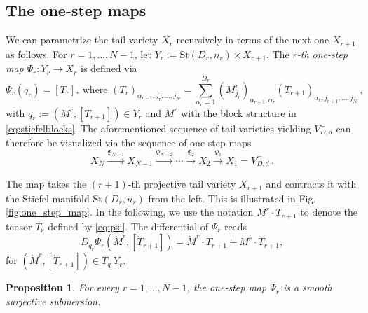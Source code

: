 \documentclass{article}
\newtheorem{proposition}[theorem]{Proposition}
\theoremstyle{definition}
\newcommand{\St}{\mathrm{St}}
\begin{document}
\subsection*{The one-step maps}\label{sec:one_step_map}

We can parametrize the tail variety $X_r$ recursively in terms of the next one $X_{r+1}$ as follows. For \(r=1,\dots,N-1\), let $Y_r := \St(D_r,n_r)\times X_{r+1}$. The \emph{$r$-th one-step map} $\Psi_r:Y_r\longrightarrow X_r$ is defined via
\begin{equation}\label{eq:psi}
\Psi_r(q_r)=[T_r], \ \text{where } (T_r)_{\alpha_{r-1},j_r,\dots,j_N}
=
\sum_{\alpha_r=1}^{D_r}
(M^r_{j_r})_{\alpha_{r-1},\alpha_r}
(T_{r+1})_{\alpha_r,j_{r+1},\dots,j_N} \ ,
\end{equation}
with $q_r := (M^r,[T_{r+1}])\in Y_r$ and $M^r$ with the block structure in \eqref{eq:stiefelblocks}. The aforementioned sequence of tail varieties yielding $V_{D,d}^=$ can therefore be visualized via the sequence of one-step maps
\begin{equation*}
    X_N \overset{\Psi_{N-1}}{\longrightarrow} X_{N-1} \overset{\Psi_{N-2}}{\longrightarrow} \cdots \overset{\Psi_{2}}{\longrightarrow} X_2 \overset{\Psi_{1}}{\longrightarrow} X_1 = V_{D,d}^=\,.
\end{equation*}


The map takes the $(r+1)$-th projective tail variety $X_{r+1}$ and contracts it with the Stiefel manifold $\St(D_r,n_r)$ from the left. This is illustrated in Fig. \ref{fig:one_step_map}. In the following, we use the notation $M^r \cdot T_{r+1}$ to denote the tensor $T_r$ defined by \eqref{eq:psi}. 
The differential of $\Psi_r$ reads
\begin{equation*}
    D_{q_r}\Psi_r(\dot M^r,[\dot T_{r+1}]) = \dot M^r \cdot  T_{r+1} + M^r \cdot \dot T_{r+1},
\end{equation*}
for $(\dot M^r,[\dot T_{r+1}]) \in T_{q_r}Y_r$.
\begin{proposition}\label{prop:Psi_r_submersion}
For every \(r=1,\dots,N-1\), the one-step map $\Psi_r$ is a smooth surjective submersion.
\end{proposition}
\end{document}
